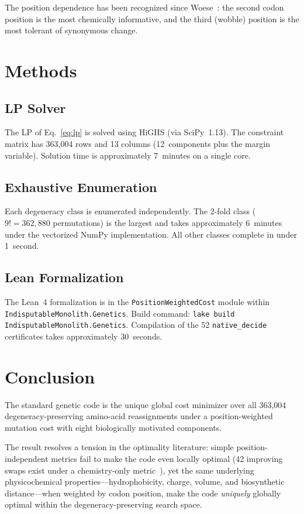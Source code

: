 \documentclass[11pt,twocolumn]{article}
\begin{document}
The position dependence has been recognized since Woese~\cite{Woese1966}:
the second codon position is the most chemically informative, and the third
(wobble) position is the most tolerant of synonymous change.

\section{Methods}

\subsection{LP Solver}

The LP of Eq.~\eqref{eq:lp} is solved using HiGHS (via SciPy~1.13). The
constraint matrix has 363,004 rows and 13 columns (12~components plus the
margin variable). Solution time is approximately 7~minutes on a single
core.

\subsection{Exhaustive Enumeration}

Each degeneracy class is enumerated independently. The 2-fold class
($9! = 362{,}880$ permutations) is the largest and takes approximately
6~minutes under the vectorized NumPy implementation. All other classes
complete in under 1~second.

\subsection{Lean Formalization}

The Lean~4 formalization is in the
\texttt{PositionWeightedCost} module within
\texttt{IndisputableMonolith.Genetics}. Build command:
\texttt{lake build IndisputableMonolith.Genetics}. Compilation of the 52
\texttt{native\_decide} certificates takes approximately 30~seconds.

\section{Conclusion}

The standard genetic code is the unique global cost minimizer over all
363,004 degeneracy-preserving amino-acid reassignments under a
position-weighted mutation cost with eight biologically motivated
components.

The result resolves a tension in the optimality literature: simple
position-independent metrics fail to make the code even locally optimal
(42 improving swaps exist under a chemistry-only metric~\cite{Paper1}),
yet the same underlying physicochemical
properties---hydrophobicity, charge, volume, and biosynthetic
distance---when weighted by codon position, make the code \emph{uniquely}
globally optimal within the degeneracy-preserving search space.
\end{document}
